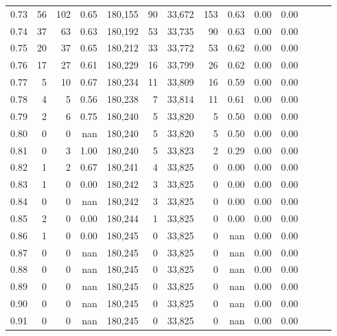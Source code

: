 \begin{tabular}{rrrrrrrrrrrrrr}
0.73 &     56 &    102 &  0.65 &  180,155 &       90 &  33,672 &     153 &  0.63 &  0.00 &      0.00 \\
0.74 &     37 &     63 &  0.63 &  180,192 &       53 &  33,735 &      90 &  0.63 &  0.00 &      0.00 \\
0.75 &     20 &     37 &  0.65 &  180,212 &       33 &  33,772 &      53 &  0.62 &  0.00 &      0.00 \\
0.76 &     17 &     27 &  0.61 &  180,229 &       16 &  33,799 &      26 &  0.62 &  0.00 &      0.00 \\
0.77 &      5 &     10 &  0.67 &  180,234 &       11 &  33,809 &      16 &  0.59 &  0.00 &      0.00 \\
0.78 &      4 &      5 &  0.56 &  180,238 &        7 &  33,814 &      11 &  0.61 &  0.00 &      0.00 \\
0.79 &      2 &      6 &  0.75 &  180,240 &        5 &  33,820 &       5 &  0.50 &  0.00 &      0.00 \\
0.80 &      0 &      0 &   nan &  180,240 &        5 &  33,820 &       5 &  0.50 &  0.00 &      0.00 \\
0.81 &      0 &      3 &  1.00 &  180,240 &        5 &  33,823 &       2 &  0.29 &  0.00 &      0.00 \\
0.82 &      1 &      2 &  0.67 &  180,241 &        4 &  33,825 &       0 &  0.00 &  0.00 &      0.00 \\
0.83 &      1 &      0 &  0.00 &  180,242 &        3 &  33,825 &       0 &  0.00 &  0.00 &      0.00 \\
0.84 &      0 &      0 &   nan &  180,242 &        3 &  33,825 &       0 &  0.00 &  0.00 &      0.00 \\
0.85 &      2 &      0 &  0.00 &  180,244 &        1 &  33,825 &       0 &  0.00 &  0.00 &      0.00 \\
0.86 &      1 &      0 &  0.00 &  180,245 &        0 &  33,825 &       0 &   nan &  0.00 &      0.00 \\
0.87 &      0 &      0 &   nan &  180,245 &        0 &  33,825 &       0 &   nan &  0.00 &      0.00 \\
0.88 &      0 &      0 &   nan &  180,245 &        0 &  33,825 &       0 &   nan &  0.00 &      0.00 \\
0.89 &      0 &      0 &   nan &  180,245 &        0 &  33,825 &       0 &   nan &  0.00 &      0.00 \\
0.90 &      0 &      0 &   nan &  180,245 &        0 &  33,825 &       0 &   nan &  0.00 &      0.00 \\
0.91 &      0 &      0 &   nan &  180,245 &        0 &  33,825 &       0 &   nan &  0.00 &      0.00 \\

\end{tabular}
